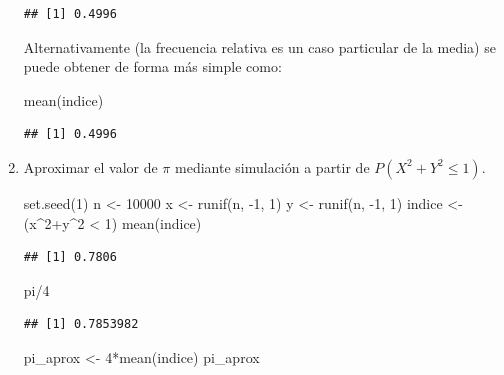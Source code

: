 \documentclass[
]{book}
\newenvironment{Shaded}{\begin{snugshade}}{\end{snugshade}}
\newcommand{\DecValTok}[1]{\textcolor[rgb]{0.00,0.00,0.81}{#1}}
\newcommand{\FunctionTok}[1]{\textcolor[rgb]{0.00,0.00,0.00}{#1}}
\newcommand{\NormalTok}[1]{#1}
\newcommand{\OtherTok}[1]{\textcolor[rgb]{0.56,0.35,0.01}{#1}}
\newcommand{\SpecialCharTok}[1]{\textcolor[rgb]{0.00,0.00,0.00}{#1}}
\theoremstyle{break}
\theoremstyle{definition}
\theoremstyle{definition}
\theoremstyle{definition}
\theoremstyle{definition}
\theoremstyle{remark}
\begin{document}
\begin{enumerate}
\begin{verbatim}
## [1] 0.4996
\end{verbatim}

  Alternativamente (la frecuencia relativa es un caso particular de la media) se puede obtener de forma más simple como:

\begin{Shaded}
\begin{Highlighting}[]
\FunctionTok{mean}\NormalTok{(indice)}
\end{Highlighting}
\end{Shaded}

\begin{verbatim}
## [1] 0.4996
\end{verbatim}
\item
  Aproximar el valor de \(\pi\) mediante simulación a partir de
  \(P\left( X^2 +Y^2 \leq 1 \right)\).

\begin{Shaded}
\begin{Highlighting}[]
\FunctionTok{set.seed}\NormalTok{(}\DecValTok{1}\NormalTok{)}
\NormalTok{n }\OtherTok{\textless{}{-}} \DecValTok{10000}
\NormalTok{x }\OtherTok{\textless{}{-}} \FunctionTok{runif}\NormalTok{(n, }\SpecialCharTok{{-}}\DecValTok{1}\NormalTok{, }\DecValTok{1}\NormalTok{)}
\NormalTok{y }\OtherTok{\textless{}{-}} \FunctionTok{runif}\NormalTok{(n, }\SpecialCharTok{{-}}\DecValTok{1}\NormalTok{, }\DecValTok{1}\NormalTok{)}
\NormalTok{indice }\OtherTok{\textless{}{-}}\NormalTok{ (x}\SpecialCharTok{\^{}}\DecValTok{2}\SpecialCharTok{+}\NormalTok{y}\SpecialCharTok{\^{}}\DecValTok{2} \SpecialCharTok{\textless{}} \DecValTok{1}\NormalTok{)}
\FunctionTok{mean}\NormalTok{(indice)}
\end{Highlighting}
\end{Shaded}

\begin{verbatim}
## [1] 0.7806
\end{verbatim}

\begin{Shaded}
\begin{Highlighting}[]
\NormalTok{pi}\SpecialCharTok{/}\DecValTok{4}
\end{Highlighting}
\end{Shaded}

\begin{verbatim}
## [1] 0.7853982
\end{verbatim}

\begin{Shaded}
\begin{Highlighting}[]
\NormalTok{pi\_aprox }\OtherTok{\textless{}{-}} \DecValTok{4}\SpecialCharTok{*}\FunctionTok{mean}\NormalTok{(indice)}
\NormalTok{pi\_aprox}
\end{Highlighting}
\end{Shaded}


\end{enumerate}
\end{document}
